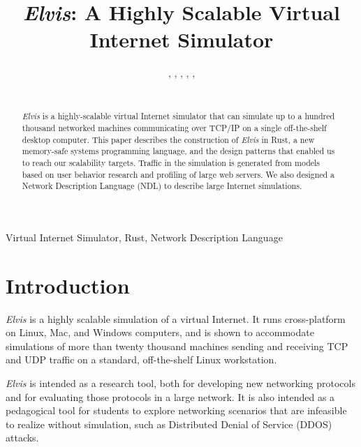 \documentclass[journal]{IEEEtran} %
\newcommand{\elvis}{\textit{Elvis}}
\begin{document}
\title{\elvis{}: A Highly Scalable Virtual Internet Simulator\\}

\author{%
    ,
    ,
    ,
    ,
    ,
    \\%
    \\%
}

\maketitle

\begin{abstract}
\elvis{} is a highly-scalable virtual Internet simulator that can simulate up to a hundred thousand networked machines communicating over TCP/IP on a single off-the-shelf desktop computer. This paper describes the construction of \elvis{} in Rust, a new memory-safe systems programming language, and the design patterns that enabled us to reach our scalability targets.  Traffic in the simulation is generated from models based on user behavior research and profiling of large web servers. We also designed a Network Description Language (NDL) to describe large Internet simulations.
\end{abstract}

\begin{IEEEkeywords}
    Virtual Internet Simulator, Rust, Network Description Language
\end{IEEEkeywords}

\section{Introduction}
\elvis{} is a highly scalable simulation of a virtual Internet. It runs cross-platform on Linux, Mac, and Windows computers, and is shown to accommodate simulations of more than twenty thousand machines sending and receiving TCP and UDP traffic on a standard, off-the-shelf Linux workstation.

\elvis{} is intended as a research tool, both for developing new networking protocols and for evaluating those protocols in a large network. It is also intended as a pedagogical tool for students to explore networking scenarios that are infeasible to realize without simulation, such as Distributed Denial of Service (DDOS) attacks.
\end{document}
